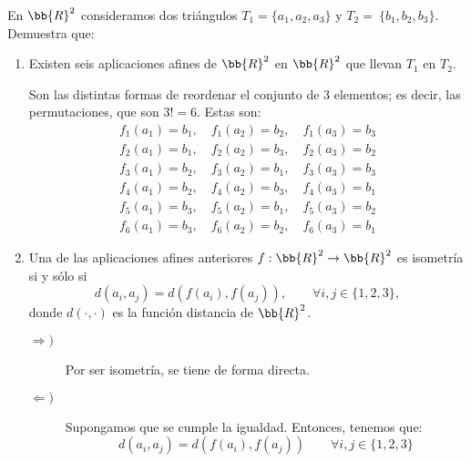 \begin{ejercicio}
    En $\bb{R}^2$ consideramos dos triángulos $T_1 = \{a_1, a_2, a_3\}$ y $T_2=~\{b_1, b_2, b_3\}$. Demuestra que:
    \begin{enumerate}
        \item Existen seis aplicaciones afines de $\bb{R}^2$ en $\bb{R}^2$ que llevan $T_1$ en $T_2$.

        Son las distintas formas de reordenar el conjunto de 3 elementos; es decir, las permutaciones, que son $3!=6$.
        Estas son:
        \begin{equation*}
            \begin{array}{l}
                f_1(a_1) = b_1,\quad f_1(a_2) = b_2,\quad f_1(a_3) = b_3 \\
                f_2(a_1) = b_1,\quad f_2(a_2) = b_3,\quad f_2(a_3) = b_2 \\
                f_3(a_1) = b_2,\quad f_3(a_2) = b_1,\quad f_3(a_3) = b_3 \\
                f_4(a_1) = b_2,\quad f_4(a_2) = b_3,\quad f_4(a_3) = b_1 \\
                f_5(a_1) = b_3,\quad f_5(a_2) = b_1,\quad f_5(a_3) = b_2 \\
                f_6(a_1) = b_3,\quad f_6(a_2) = b_2,\quad f_6(a_3) = b_1
            \end{array}
        \end{equation*}

        \item Una de las aplicaciones afines anteriores $f : \bb{R}^2 \to \bb{R}^2$ es isometría si y sólo si
        \begin{equation*}
            d(a_i, a_j ) = d(f(a_i), f(a_j )), \qquad \forall i, j \in \{1, 2, 3\},
        \end{equation*}
        donde $d(\cdot, \cdot)$ es la función distancia de $\bb{R}^2$.

        \begin{description}
            \item[$\Longrightarrow)$] Por ser isometría, se tiene de forma directa.
            \item[$\Longleftarrow)$] Supongamos que se cumple la igualdad. Entonces, tenemos que:
            \begin{equation*}
                d(a_i, a_j) = d(f(a_i), f(a_j)) \qquad \forall i,j\in \{1,2,3\}
            \end{equation*}


\end{description}
\end{enumerate}
\end{ejercicio}
